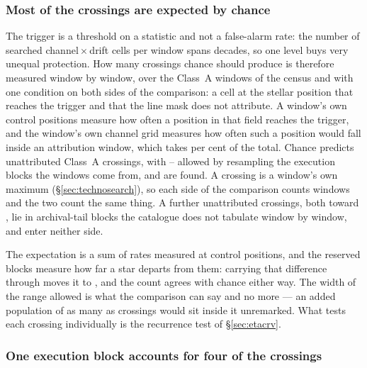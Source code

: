 \subsubsection{Most of the crossings are expected by chance}
\label{sec:trigunif}

The trigger is a threshold on a statistic and not a false-alarm rate: the
number of searched channel\,$\times$\,drift cells per window spans
\TuCellsDecades{} decades, so one level buys very unequal protection. How
many crossings chance should produce is therefore measured window by window,
over the \CeNWin{} Class~A windows of the census and with one condition on
both sides of the comparison: a cell at the stellar position that reaches the
trigger and that the line mask does not attribute. A window's own \NCtrl{}
control positions measure how often a position in that field reaches the
trigger, and the window's own channel grid measures how often such a position
would fall inside an attribution window, which takes \CeMaskPct{} per cent of
the total. Chance predicts \CeExp{} unattributed Class~A crossings, with
\CeLo--\CeHi{} allowed by resampling the execution blocks the windows come
from, and \CeObs{} are found. A crossing is a window's own maximum
(\S\ref{sec:technosearch}), so each side of the comparison counts windows and
the two count the same thing. A further \CeNTailCrossWord{} unattributed
crossings, both toward \CeTailStar, lie in archival-tail blocks the catalogue
does not tabulate window by window, and enter neither side.

The expectation is a sum of rates measured at control positions, and the
reserved blocks measure how far a star departs from them: carrying that
difference through moves it to \CeExpX, and the count agrees with chance
either way. The width of the range allowed is what the comparison can say and
no more --- an added population of as many as \CeAddBlind{} crossings would
sit inside it unremarked. What tests each crossing individually is the
recurrence test of \S\ref{sec:etacrv}.

\subsubsection{One execution block accounts for four of the crossings}
\label{sec:bdblock}


